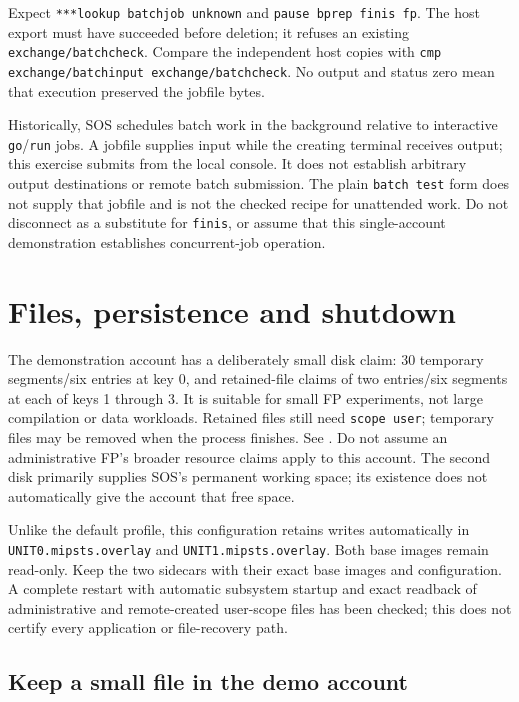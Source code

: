Expect \texttt{***lookup batchjob unknown} and
\texttt{pause bprep finis fp}. The host export must have succeeded before
deletion; it refuses an existing \texttt{exchange/batchcheck}. Compare the
independent host copies with \texttt{cmp exchange/batchinput exchange/batchcheck}.
No output and status zero mean that execution preserved the jobfile bytes.

Historically, SOS schedules batch work in the background relative to
interactive \texttt{go}/\texttt{run} jobs. A jobfile supplies input while the
creating terminal receives output; this exercise submits from the local console.
It does not establish arbitrary output destinations or remote batch submission.
The plain \texttt{batch test} form does
not supply that jobfile and is not the checked recipe for unattended work.
Do not disconnect as a substitute for \texttt{finis}, or assume that this
single-account demonstration establishes concurrent-job operation.

\section{Files, persistence and shutdown}\label{mips-ts-persistence}

The demonstration account has a deliberately small disk claim: 30 temporary
segments/six entries at key 0, and retained-file claims of two entries/six
segments at each of keys 1 through 3. It is suitable for small FP experiments, not large compilation or
data workloads. Retained files still need \texttt{scope user}; temporary
files may be removed when the process finishes. See
.
Do not assume an administrative FP's broader resource claims apply to this
account. The second disk primarily supplies SOS's permanent working space;
its existence does not automatically give the account that free space.

Unlike the default profile, this configuration retains writes automatically
in \texttt{UNIT0.mipsts.overlay} and \texttt{UNIT1.mipsts.overlay}. Both base
images remain read-only. Keep the two sidecars with their exact base images
and configuration. A complete restart with automatic subsystem startup and
exact readback of administrative and remote-created user-scope files has been checked; this
does not certify every application or file-recovery path.

\subsection{Keep a small file in the demo account}\label{mips-ts-retained-file}

